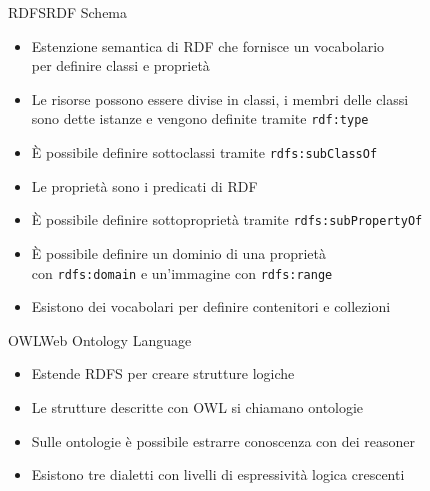 \documentclass[dvips, 11pt]{beamer}
\begin{document}
\begin{frame}{RDFS}{RDF Schema}
  \begin{itemize}
  \item Estenzione semantica di RDF che fornisce un vocabolario\\
    per definire \alert{classi} e \alert{propriet\`a}
    \pause
  \item Le risorse possono essere divise in classi, i membri delle classi\\
    sono dette \alert{istanze} e vengono definite tramite \texttt{rdf:type}
    \pause
  \item \`E possibile definire \alert{sottoclassi} tramite \texttt{rdfs:subClassOf}
    \pause
  \item Le propriet\`a sono i predicati di RDF
    \pause
  \item \`E possibile definire \alert{sottopropriet\`a} tramite \texttt{rdfs:subPropertyOf}
    \pause
  \item \`E possibile definire un \alert{dominio} di una propriet\`a\\
    con \texttt{rdfs:domain} e un'\alert{immagine} con \texttt{rdfs:range}
    \pause
  \item Esistono dei vocabolari per definire \alert{contenitori} e \alert{collezioni}
  \end{itemize}
\end{frame}

\begin{frame}{OWL}{Web Ontology Language}
  \begin{itemize}
  \item Estende RDFS per creare strutture logiche
    \pause
  \item Le strutture descritte con OWL si chiamano \alert{ontologie}
    \pause
  \item Sulle ontologie \`e possibile estrarre conoscenza con dei \alert{reasoner}
    \pause
  \item Esistono tre dialetti con livelli di espressivit\`a logica crescenti
  \end{itemize}
\end{frame}
\end{document}
